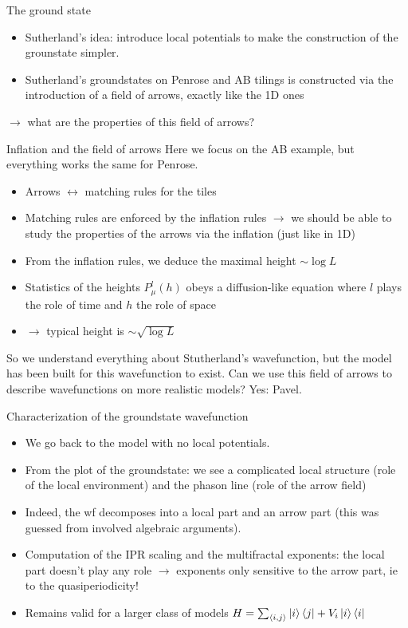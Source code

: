 \documentclass[xcolor=x11names,compress,professionalfonts]{beamer}
\renewcommand{\(}{\begin{columns}}
\renewcommand{\)}{\end{columns}}
\newcommand{\<}[1]{\begin{column}{#1}}
\renewcommand{\>}{\end{column}}
\begin{document}
\begin{frame}{The ground state}
\begin{itemize}
	\item Sutherland's idea: introduce local potentials to make the construction of the grounstate simpler.
	\item Sutherland's groundstates on Penrose and AB tilings is constructed via the introduction of a field of arrows, exactly like the 1D ones
\end{itemize}
$\rightarrow$ what are the properties of this field of arrows?
\end{frame}

\begin{frame}{Inflation and the field of arrows}
Here we focus on the AB example, but everything works the same for Penrose.
\begin{itemize}
	\item Arrows $\leftrightarrow$ matching rules for the tiles 
	\item Matching rules are enforced by the inflation rules $\rightarrow$ we should be able to study the properties of the arrows via the inflation (just like in 1D)
	\item From the inflation rules, we deduce the maximal height $\sim \log L$
	\item Statistics of the heights $P_\mu^{l}(h)$ obeys a diffusion-like equation where $l$ plays the role of time and $h$ the role of space
	\item $\rightarrow$ typical height is $\sim \sqrt{\log L}$
\end{itemize}
So we understand everything about Stutherland's wavefunction, but the model has been built for this wavefunction to exist. 
Can we use this field of arrows to describe wavefunctions on more realistic models?
Yes: Pavel.
\end{frame}

\begin{frame}{Characterization of the groundstate wavefunction}
\begin{itemize}
	\item We go back to the model with no local potentials. 
	\item From the plot of the groundstate: we see a complicated local structure (role of the local environment) and the phason line (role of the arrow field)
	\item Indeed, the wf decomposes into a local part and an arrow part (this was guessed from involved algebraic arguments).
	\item Computation of the IPR scaling and the multifractal exponents: the local part doesn't play any role $\rightarrow$ exponents only sensitive to the arrow part, ie to the quasiperiodicity!
	\item Remains valid for a larger class of models $H = \sum_{\langle i, j \rangle} \ket{i} \bra{j} + V_i \ket{i} \bra{i} $
\end{itemize}
\end{frame}
\end{document}
